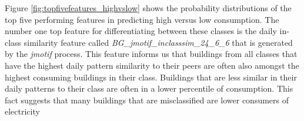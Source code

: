 Figure \ref{fig:topfivefeatures_highvslow} shows the probability distributions of the top five performing features in predicting high versus low consumption. The number one top feature for differentiating between these classes is the daily in-class similarity feature called \emph{BG_jmotif_inclasssim_24_6_6} that is generated by the \emph{jmotif} process. This feature informs us that buildings from all classes that have the highest daily pattern similarity to their peers are often also amongst the highest consuming buildings in their class. Buildings that are less similar in their daily patterns to their class are often in a lower percentile of consumption. This fact suggests that many buildings that are misclassified are lower consumers of electricity